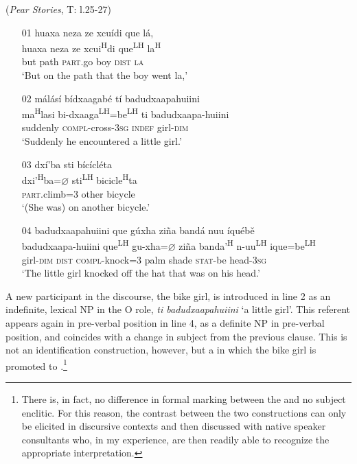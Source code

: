 \ea\label{topicalization1}  (\textit{Pear Stories}, T: l.25-27)
\begin{itemize}
\item[01]
\glll huaxa neza ze xcu\'{i}di que l\'{a},  \\
huaxa neza ze xcui\textsuperscript{H}di que\textsuperscript{LH} la\textsuperscript{H}  \\
but path \textsc{part}.go boy \textsc{dist} \textsc{la}  \\
\glt `But on the path that the boy went la,'


\item[02]
\glll m\'{a}l\'{a}s\'{i} b\'{i}dxaagab\'{e} t\'{i} badudxaapahuiini  \\
ma\textsuperscript{H}lasi bi-dxaaga\textsuperscript{LH}=be\textsuperscript{LH} ti badudxaapa-huiini  \\
suddenly \textsc{compl}-cross-3\textsc{sg} \textsc{indef} girl-\textsc{dim}  \\
\glt `Suddenly he encountered a little girl.'


\item[03]
\glll dx\'{i}'ba sti b\'{i}c\'{i}cl\'{e}ta  \\
dxi'\textsuperscript{H}ba=$\varnothing$ sti\textsuperscript{LH} bicicle\textsuperscript{H}ta  \\
\textsc{part}.climb=\textsc{3} other bicycle  \\
\glt `(She was) on another bicycle.'


\item[04]
\glll badudxaapahuiini que g\'{u}xha zi\~{n}a band\'{a} nuu \'{i}qu\'{e}b\v{e}  \\
badudxaapa-huiini que\textsuperscript{LH} gu-xha=$\varnothing$ zi\~{n}a banda'\textsuperscript{H} n-uu\textsuperscript{LH} ique=be\textsuperscript{LH}  \\
girl-\textsc{dim} \textsc{dist} \textsc{compl}-knock=\textsc{3} palm shade \textsc{stat}-be head-3\textsc{sg}  \\
\glt `The little girl knocked off the hat that was on his head.' 

\end{itemize}
\z
A new participant in the discourse, the bike girl, is introduced in line 2 as an indefinite, lexical NP in the O role, \textit{ti badudxaapahuiini} `a little girl'. This referent appears again in pre-verbal position in line 4, as a definite NP in pre-verbal position, and coincides with a change in subject from the previous clause. This is not an identification construction, however, but a  in which the bike girl is promoted to .\footnote{There is, in fact, no difference in formal marking between the  and no subject enclitic. For this reason, the contrast between the two constructions can only be elicited in discursive contexts and then discussed with native speaker consultants who, in my experience, are then readily able to recognize the appropriate interpretation.} 

